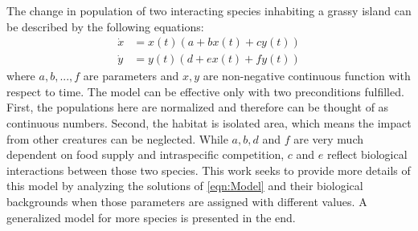 The change in population of two interacting species inhabiting a grassy island can be described by the following equations:
\begin{equation}\label{eqn:Model}
\begin{aligned} 
\dot{x}&=x(t)(a+bx(t)+cy(t)) \\
\dot{y}&=y(t)(d+ex(t)+fy(t))
\end{aligned}
\end{equation}
where $a, b, ... ,f$ are parameters and $x, y$ are non-negative continuous function with respect to time. The model can be effective only with two preconditions fulfilled. First, the populations here are normalized and therefore can be thought of as continuous numbers. Second, the habitat is isolated area, which means the impact from other creatures can be neglected. While $a, b, d$ and $f$ are very much dependent on food supply and intraspecific competition, $c$ and $e$ reflect biological interactions between those two species. This work seeks to provide more details of this model by analyzing the solutions of \eqref{eqn:Model} and their biological backgrounds when those parameters are assigned with different values. A generalized model for more species is presented in the end.